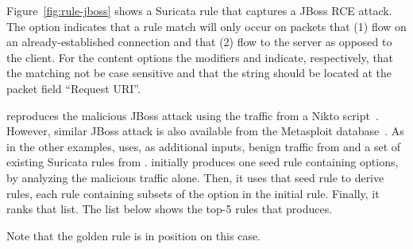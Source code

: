 \documentclass[sigconf,review, anonymous]{acmart}
\begin{document}
Figure~\ref{fig:rule-jboss} shows a Suricata rule that captures a
JBoss RCE attack.  The option 
indicates that a rule match will only occur on packets that (1) flow
on an already-established connection and that (2) flow to the server
as opposed to the client. For the content options the modifiers
 and  indicate, respectively, that
the matching not be case sensitive and that the string should be
located at the packet field ``Request URI''. 

\tname{} reproduces the malicious JBoss attack using the traffic from
a Nikto script~\cite{nikto}. However, similar JBoss attack is also
available from the Metasploit database~\cite{metasploit}. As in the
other examples, \tname{} uses, as additional inputs, benign traffic
from  and a set of existing Suricata rules from
. \tname{} initially produces one seed rule containing
 options, by analyzing the malicious traffic alone. Then, it
uses that seed rule to derive  rules, each rule containing
subsets of the option in the initial rule. Finally, it ranks that
list. The list below shows the top-5 rules that \tname{}
produces.


Note that the golden rule is in position  on this
case. 


\end{document}

